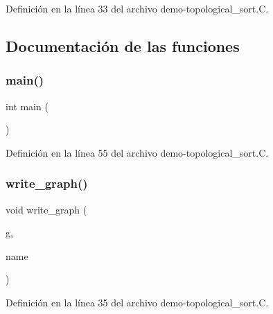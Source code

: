 Definición en la línea 33 del archivo demo-\/topological\+\_\+sort.\+C.



\subsection{Documentación de las funciones}
\mbox{\label{demo-topological__sort_8_c_ae66f6b31b5ad750f1fe042a706a4e3d4}} 
\subsubsection{\texorpdfstring{main()}{main()}}
{\footnotesize\ttfamily int main (\begin{DoxyParamCaption}{ }\end{DoxyParamCaption})}



Definición en la línea 55 del archivo demo-\/topological\+\_\+sort.\+C.

\mbox{\label{demo-topological__sort_8_c_ab82a33da73b0e5278780967809b0791d}} 
\subsubsection{\texorpdfstring{write\+\_\+graph()}{write\_graph()}}
{\footnotesize\ttfamily void write\+\_\+graph (\begin{DoxyParamCaption}\item[{\hyperlink{demo-buildgraph_8_c_ae73e956c2a8cf0a58255aa6b659985e0}{D\+GT} \&}]{g,  }\item[{const char $\ast$}]{name }\end{DoxyParamCaption})}



Definición en la línea 35 del archivo demo-\/topological\+\_\+sort.\+C.

